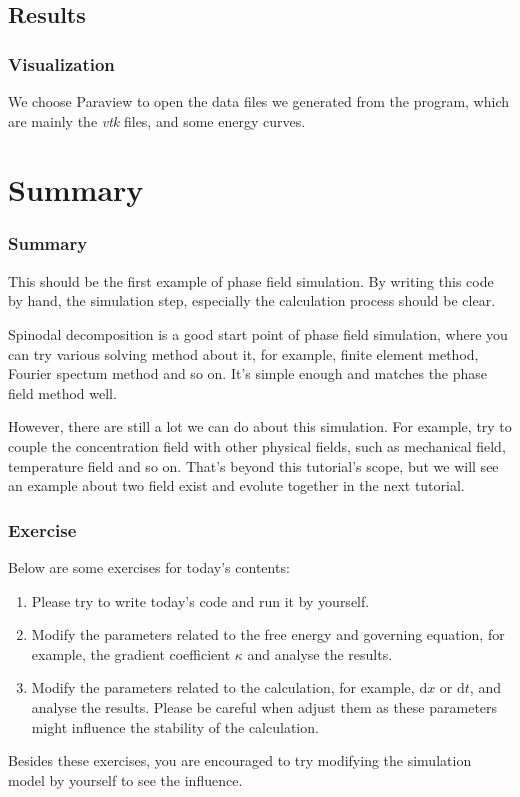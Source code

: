 \documentclass[compress,xcolor={dvipsnames}]{beamer}
\begin{document}
\subsection{Results}
\begin{frame}
    \frametitle{Visualization}

    We choose Paraview to open the data files we generated from the program, which are mainly the \emph{vtk} files, and some energy curves.

\end{frame}

\section{Summary}
\begin{frame}
    \frametitle{Summary}

    This should be the first example of phase field simulation. By writing this code by hand, the simulation step, especially the calculation process should be clear.

    Spinodal decomposition is a good start point of phase field simulation, where you can try various solving method about it, for example, finite element method, Fourier spectum method and so on. It's simple enough and matches the phase field method well.

    However, there are still a lot we can do about this simulation. For example, try to couple the concentration field with other physical fields, such as mechanical field, temperature field and so on. That's beyond this tutorial's scope, but we will see an example about two field exist and evolute together in the next tutorial.

\end{frame}

\begin{frame}
    \frametitle{Exercise}

    Below are some exercises for today's contents:

    \begin{enumerate}
        \item Please try to write today's code and run it by yourself.
        \item Modify the parameters related to the free energy and governing equation, for example, the gradient coefficient \(\kappa\) and analyse the results.
        \item Modify the parameters related to the calculation, for example, \(\mathrm{d}x\) or \(\mathrm{d}t\), and analyse the results. Please be careful when adjust them as these parameters might influence the stability of the calculation.
    \end{enumerate}

    Besides these exercises, you are encouraged to try modifying the simulation model by yourself to see the influence.

\end{frame}
\end{document}
